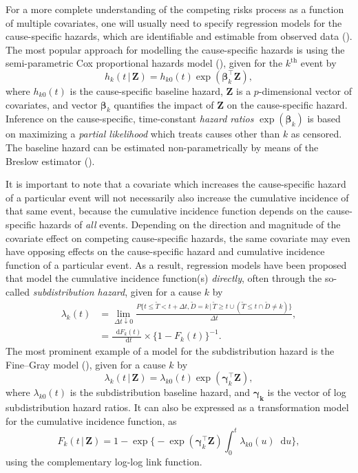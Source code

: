 \documentclass[
  letterpaper,
  paper=240mm:170mm,
  twoside=true,
  open=right,
  fontsize=10pt,
  pagesize=false,
  BCOR=15mm,
  DIV=14,
  headinclude=true,
  footinclude=false,
  headsepline=on]{scrbook}
\newcommand{\given}{\,|\,}
\newcommand\diff{\mathop{}\!\mathrm{d}}
\begin{document}
For a more complete understanding of the competing risks process as a
function of multiple covariates, one will usually need to specify
regression models for the cause-specific hazards, which are identifiable
and estimable from observed data
(). The most popular approach for modelling the cause-specific
hazards is using the semi-parametric Cox proportional hazards model
(), given for
the \(k^{\text{th}}\) event by \[
h_k(t \given \mathbf{Z}) = h_{k0}(t)\exp(\boldsymbol{\beta}_k^\top \mathbf{Z}),
\] where \(h_{k0}(t)\) is the cause-specific baseline hazard,
\(\mathbf{Z}\) is a \(p\)-dimensional vector of covariates, and vector
\(\boldsymbol{\beta}_k\) quantifies the impact of \(\mathbf{Z}\) on the
cause-specific hazard. Inference on the cause-specific, time-constant
\emph{hazard ratios} \(\exp(\boldsymbol{\beta}_k)\) is based on
maximizing a \emph{partial likelihood} which treats causes other than
\(k\) as censored. The baseline hazard can be estimated
non-parametrically by means of the Breslow estimator
().

It is important to note that a covariate which increases the
cause-specific hazard of a particular event will not necessarily also
increase the cumulative incidence of that same event, because the
cumulative incidence function depends on the cause-specific hazards of
\emph{all} events. Depending on the direction and magnitude of the
covariate effect on competing cause-specific hazards, the same covariate
may even have opposing effects on the cause-specific hazard and
cumulative incidence function of a particular event. As a result,
regression models have been proposed that model the cumulative incidence
function(s) \emph{directly}, often through the so-called
\emph{subdistribution hazard}, given for a cause \(k\) by \[
\begin{aligned}
    \lambda_k(t) &= \lim_{\Delta t \downarrow 0} \frac{P\{t \leq \tilde{T} < t + \Delta t, \tilde{D} = k \given \tilde{T} \geq t \cup (\tilde{T} \leq t \cap \tilde{D} \neq k)\}}{\Delta t}, \\
    &= \frac{\diff F_k(t)}{\diff t} \times \{1 - F_k(t)\}^{-1}.
\end{aligned}
\] The most prominent example of a model for the subdistribution hazard
is the Fine--Gray model
(),
given for a cause \(k\) by \[
\lambda_k(t \given \mathbf{Z}) = \lambda_{k0}(t)\exp(\boldsymbol{\gamma}_k^\top \mathbf{Z}),
\] where \(\lambda_{k0}(t)\) is the subdistribution baseline hazard, and
\(\boldsymbol{\gamma_k}\) is the vector of log subdistribution hazard
ratios. It can also be expressed as a transformation model for the
cumulative incidence function, as \[
F_k(t \given \mathbf{Z}) = 1 - \exp \Biggl\{ -\exp(\boldsymbol{\gamma}_k^\top \mathbf{Z}) \int_{0}^{t} \lambda_{k0}(u)\diff u \Biggr\},
\] using the complementary log-log link function.
\end{document}
